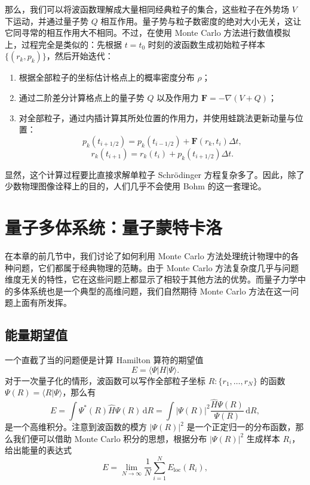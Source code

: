 那么，我们可以将波函数理解成大量相同经典粒子的集合，这些粒子在外势场 $V$ 下运动，并通过量子势 $Q$ 相互作用。量子势与粒子数密度的绝对大小无关，这让它同寻常的相互作用大不相同。不过，在使用 Monte Carlo 方法进行数值模拟上，过程完全是类似的：先根据 $t=t_0$ 时刻的波函数生成初始粒子样本 $\{(r_k,p_k)\}$，然后开始迭代：
\begin{enumerate}[label=(\arabic*),leftmargin=2em]
\item 根据全部粒子的坐标估计格点上的概率密度分布 $\rho$；
\item 通过二阶差分计算格点上的量子势 $Q$ 以及作用力 $\mathbf F=-\nabla(V+Q)$；
\item 对全部粒子，通过内插计算其所处位置的作用力，并使用蛙跳法更新动量与位置：
\[
p_k(t_{i+1/2})=p_k(t_{i-1/2})+\mathbf F(r_k,t_i)\Delta t,
\]
\[
r_k(t_{i+1})=r_k(t_i)+p_k(t_{i+1/2})\Delta t.
\]
\end{enumerate}
显然，这个计算过程要比直接求解单粒子 Schrödinger 方程复杂多了。因此，除了少数物理图像诠释上的目的，人们几乎不会使用 Bohm 的这一套理论。

\section{量子多体系统：量子蒙特卡洛}

在本章的前几节中，我们讨论了如何利用 Monte Carlo 方法处理统计物理中的各种问题，它们都属于经典物理的范畴。由于 Monte Carlo 方法复杂度几乎与问题维度无关的特性，它在这些问题上都显示了相较于其他方法的优势。而量子力学中的多体系统也是一个典型的高维问题，我们自然期待 Monte Carlo 方法在这一问题上面有所发挥。

\subsection{能量期望值}

一个直截了当的问题便是计算 Hamilton 算符的期望值
\begin{equation}
E=\langle\Psi|H|\Psi\rangle.
\tag{7.6.1}
\end{equation}
对于一次量子化的情形，波函数可以写作全部粒子坐标 $R:\{r_1,\ldots,r_N\}$ 的函数 $\Psi(R)=\langle R|\Psi\rangle$，那么有
\begin{equation}
E=\int \Psi^*(R)\hat H\Psi(R)\,\mathrm dR=\int |\Psi(R)|^2\frac{\hat H\Psi(R)}{\Psi(R)}\,\mathrm dR,
\tag{7.6.2}
\end{equation}
是一个高维积分。注意到波函数的模方 $|\Psi(R)|^2$ 是一个正定归一的分布函数，那么我们便可以借助 Monte Carlo 积分的思想，根据分布 $|\Psi(R)|^2$ 生成样本 $R_i$，给出能量的表达式
\begin{equation}
E=\lim_{N\to\infty}\frac1N\sum_{i=1}^{N}E_{\mathrm{loc}}(R_i),
\tag{7.6.3}
\end{equation}

